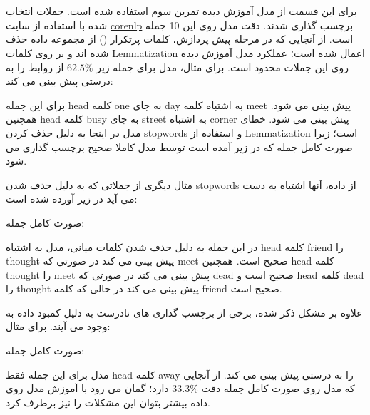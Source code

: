\section{}

برای این قسمت از مدل آموزش دیده تمرین سوم استفاده شده است. جملات انتخاب شده با استفاده از سایت
\href{https://corenlp.run/}{corenlp}
برچسب گذاری شدند. دقت مدل روی این 10 جمله 
است. از آنجایی که در مرحله پیش پردازش، کلمات پرتکرار () از مجموعه داده حذف شده اند و بر روی کلمات 
Lemmatization
اعمال شده است؛ عملکرد مدل آموزش دیده روی این جملات محدود است. برای مثال، مدل برای جمله زیر $62.5\%$ از روابط را به درستی پیش بینی می کند:
\begin{center}
\end{center}


برای این جمله head کلمه one به جای day به اشتباه کلمه meet پیش بینی می شود. همچنین head کلمه busy به جای street به اشتباه corner پیش بینی می شود. خطای مدل در اینجا به دلیل حذف کردن stopwords و استفاده از
Lemmatization
است؛ زیرا صورت کامل جمله که در زیر آمده است توسط مدل کاملا صحیح برچسب گذاری می شود.
\begin{center}
\end{center}

مثال دیگری از جملاتی که به دلیل حذف شدن stopwords از داده، 
آنها اشتباه به دست می آید در زیر آورده شده است:
\begin{center}
\end{center}
صورت کامل جمله:
\begin{center}
\end{center}

در این جمله به دلیل حذف شدن کلمات میانی، مدل به اشتباه head کلمه friend را thought پیش بینی می کند در صورتی که meet صحیح است. همچنین head کلمه thought را meet پیش بینی می کند در صورتی که dead صحیح است و head کلمه dead را thought پیش بینی می کند در حالی که کلمه friend صحیح است.

علاوه بر مشکل ذکر شده، برخی از برچسب گذاری های نادرست به دلیل کمبود داده به وجود می آیند. برای مثال:

\begin{center}
\end{center}

صورت کامل جمله:


\begin{center}
\end{center}

مدل برای این جمله فقط head کلمه away را به درستی پیش بینی می کند. از آنجایی که مدل روی صورت کامل جمله دقت $33.3\%$ دارد؛ گمان می رود با آموزش مدل روی داده بیشتر بتوان این مشکلات را نیز برطرف کرد.
